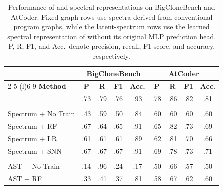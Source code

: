 \begin{table}[!htbp]
\centering
\caption{Performance of \method{} and spectral representations on BigCloneBench and AtCoder. Fixed-graph rows use spectra derived from conventional program graphs, while the latent-spectrum rows use the learned spectral representation of \method{} without its original MLP prediction head. P, R, F1, and Acc.\ denote precision, recall, F1-score, and accuracy, respectively.}
\label{tab:rq1}

\scriptsize
\setlength{\tabcolsep}{2.4pt}
\renewcommand{\arraystretch}{1.00}

\begin{tabular}{@{}lcccccccc@{}}
\toprule
& \multicolumn{4}{c}{\textbf{BigCloneBench}}
& \multicolumn{4}{c}{\textbf{AtCoder}} \\
\cmidrule(lr){2-5}
\cmidrule(l){6-9}
\textbf{Method}
& \textbf{P} & \textbf{R} & \textbf{F1} & \textbf{Acc.}
& \textbf{P} & \textbf{R} & \textbf{F1} & \textbf{Acc.} \\
\midrule

\textbf{\method{}}
& .73 & .79 & .76 & .93
& .78 & .86 & .82 & .81 \\

\midrule

\rowcolor{black!7}
\multicolumn{9}{@{}l}{\textit{Learned latent spectral representation}} \\

\method{} Spectrum + No Train
& .43 & .59 & .50 & .84
& .60 & .60 & .60 & .60 \\

\method{} Spectrum + RF
& .67 & .64 & .65 & .91
& .65 & .82 & .73 & .69 \\

\method{} Spectrum + LR
& .61 & .61 & .61 & .89
& .62 & .81 & .70 & .66 \\

\method{} Spectrum + SNN
& .67 & .67 & .67 & .91
& .69 & .78 & .73 & .71 \\

\midrule

\rowcolor{black!7}
\multicolumn{9}{@{}l}{\textit{Fixed-graph spectral representations}} \\

AST + No Train
& .14 & .96 & .24 & .17
& .50 & .66 & .57 & .50 \\

AST + RF
& .33 & .41 & .37 & .81
& .58 & .67 & .62 & .60 \\


\end{tabular}
\end{table}
